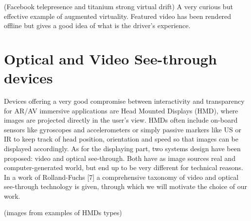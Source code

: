 (Facebook telepresence and titanium strong virtual drift) A very curious but effective example of augmented virtuality. Featured video has been rendered offline but gives a good idea of what is the driver's experience.

\section{Optical and Video See-through devices} %
Devices offering a very good compromise between interactivity and transparency for AR/AV immersive applications are Head Mounted Displays (HMD), where images are projected directly in the user’s view. HMDs often include on-board sensors like gyroscopes and accelerometers or simply passive markers like US or IR to keep track of head position, orientation and speed so that images can be displayed accordingly. As for the displaying part, two systems design have been proposed: video and optical see-through. Both have as image sources real and computer-generated world, but end up to be very different for technical reasons. In a work of Rolland-Fuchs [7] a comprehensive taxonomy of video and optical see-through technology is given, through which we will motivate the choice of our work.

(images from examples of HMDs types)

